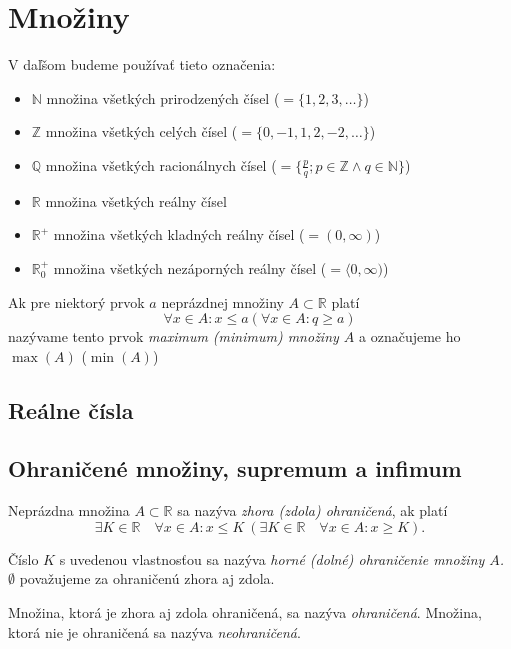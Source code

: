 \chapter{Množiny}

V daľšom budeme používať tieto označenia:
\begin{itemize}[label=]
  \item $\mathbb{N}$ množina všetkých prirodzených čísel ($= \{ 1, 2, 3, \ldots \}$)
  \item $\mathbb{Z}$ množina všetkých celých čísel ($= \{ 0, -1, 1, 2, -2, \ldots \}$)
  \item $\mathbb{Q}$ množina všetkých racionálnych čísel
    ($= \{ \frac{p}{q}; p \in \mathbb{Z} \land q \in \mathbb{N} \}$)
  \item $\mathbb{R}$ množina všetkých reálny čísel
  \item $\mathbb{R}^+$ množina všetkých kladných reálny čísel ($= ( 0, \infty )$)
  \item $\mathbb{R}^+_0$ množina všetkých nezáporných reálny čísel
    ($= \langle 0, \infty )$)
\end{itemize}
Ak pre niektorý prvok $a$ neprázdnej množiny $A \subset \mathbb{R}$ platí
\[
  \forall x \in A : x \leq a (\forall x \in A: q \geq a)
\]
nazývame tento prvok \emph{maximum (minimum) množiny $A$} a označujeme ho
$\max(A)$ ($\min(A)$)

\section{Reálne čísla}

\begin{enumerate}[resume]
\end{enumerate}

\section{Ohraničené množiny, supremum a infimum}

Neprázdna množina $A \subset \mathbb{R}$ sa nazýva \textit{zhora (zdola)
ohraničená}, ak platí
\[
\exists K \in  \mathbb{R} \quad \forall x \in A: x \leq K \:
(\exists K \in \mathbb{R} \quad \forall x \in A: x \geq K).
\]

Číslo $K$ s uvedenou vlastnosťou sa nazýva \textit{horné (dolné)
ohraničenie množiny $A$.} $\emptyset$ považujeme za ohraničenú zhora aj zdola.

Množina, ktorá je zhora aj zdola ohraničená, sa nazýva \textit{ohraničená}.
Množina, ktorá nie je ohraničená sa nazýva \textit{neohraničená}.

